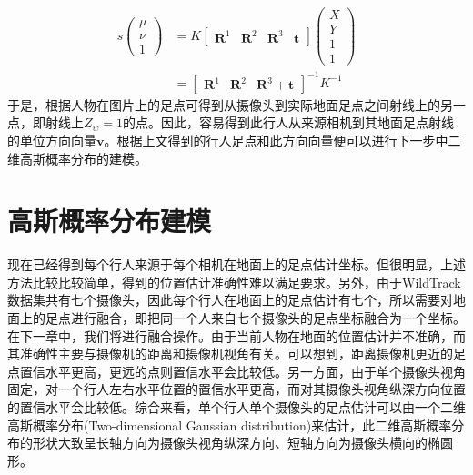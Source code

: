 \begin{equation*}
  \begin{aligned}
    s\left(
      \begin{matrix}
        \mu \\ \nu \\ 1
      \end{matrix}
    \right)
    &=K\left[
      \begin{matrix}
        \bm{R}^{1}&\bm{R}^{2}&\bm{R}^{3}&\bm{t}
      \end{matrix}
    \right]
    \left(
      \begin{matrix}
        X \\ Y \\ 1 \\ 1
      \end{matrix}
    \right) \\
    &=\left[
      \begin{matrix}
        \bm{R}^{1}&\bm{R}^{2}&\bm{R}^{3}+\bm{t}
      \end{matrix}
    \right]^{-1}K^{-1}
  \end{aligned}
\end{equation*}
于是，根据人物在图片上的足点可得到从摄像头到实际地面足点之间射线上的另一点，即射线上$Z_{w}=1$的点。因此，容易得到此行人从来源相机到其地面足点射线的单位方向向量$\bm{v}$。根据上文得到的行人足点和此方向向量便可以进行下一步中二维高斯概率分布的建模。

\section{高斯概率分布建模}

现在已经得到每个行人来源于每个相机在地面上的足点估计坐标。但很明显，上述方法比较比较简单，得到的位置估计准确性难以满足要求。另外，由于WildTrack数据集共有七个摄像头，因此每个行人在地面上的足点估计有七个，所以需要对地面上的足点进行融合，即把同一个人来自七个摄像头的足点坐标融合为一个坐标。在下一章中，我们将进行融合操作。由于当前人物在地面的位置估计并不准确，而其准确性主要与摄像机的距离和摄像机视角有关。可以想到，距离摄像机更近的足点置信水平更高，更远的点则置信水平会比较低。另一方面，由于单个摄像头视角固定，对一个行人左右水平位置的置信水平更高，而对其摄像头视角纵深方向位置的置信水平会比较低。综合来看，单个行人单个摄像头的足点估计可以由一个二维高斯概率分布(Two-dimensional Gaussian distribution)来估计，此二维高斯概率分布的形状大致呈长轴方向为摄像头视角纵深方向、短轴方向为摄像头横向的椭圆形。

